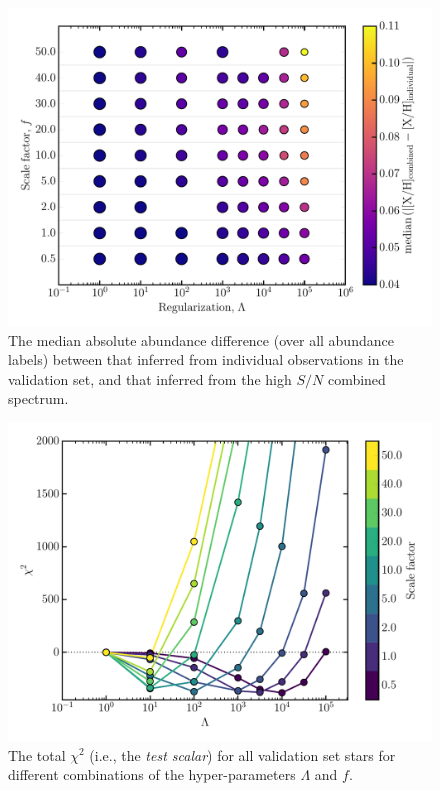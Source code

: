 \documentclass[12pt,preprint]{aastex}
\begin{document}
\begin{figure}[p]
\centering
\includegraphics[width=\textwidth]{gs-mad-all-elements.pdf}
\caption{The median absolute abundance difference (over all abundance labels)
between that inferred from individual observations in the validation set, and
that inferred from the high $S/N$ combined spectrum.
\label{fig:gridsearch-mad-all-elements}}
\end{figure}



\begin{figure}[p]
\centering
\includegraphics[width=\textwidth]{validation-scalar.pdf}
\caption{The total $\chi^2$ (i.e., the \emph{test scalar}) for all validation set stars for different combinations of the hyper-parameters $\Lambda$ and $f$.
 \label{fig:gridsearch-test-scalar}}
\end{figure}
\end{document}
